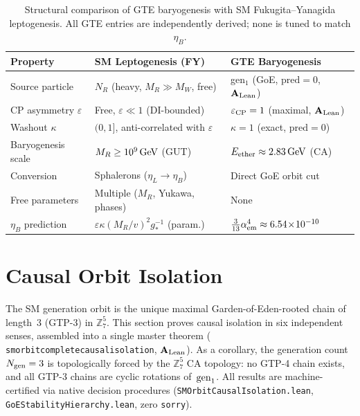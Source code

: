 \documentclass[11pt]{article}
\theoremstyle{remark}
\newcommand{\Ngen}{N_{\rm gen}}
\newcommand{\lean}[1]{%
  \penalty-100
  \begingroup\def\_{\textunderscore\allowbreak}\texttt{#1}\endgroup}
\newcommand{\CatAL}{\ensuremath{\textbf{A}_{\rm Lean}}}
\begin{document}
\begin{table}[h]
\centering
\caption{Structural comparison of GTE baryogenesis with SM Fukugita--Yanagida
         leptogenesis.  All GTE entries are independently derived; none is tuned
         to match $\eta_B$.}
\label{tab:leptogenesis}
\renewcommand{\arraystretch}{1.25}
\small
\begin{tabular}{lll}
\hline
\textbf{Property} & \textbf{SM Leptogenesis (FY)} & \textbf{GTE Baryogenesis} \\
\hline
Source particle
  & $N_R$ (heavy, $M_R\gg M_W$, free)
  & gen$_1$ (GoE, $\mathrm{pred}=0$, $\CatAL$) \\
CP asymmetry $\varepsilon$
  & Free, $\varepsilon\ll 1$ (DI-bounded)
  & $\varepsilon_{\rm CP}=1$ (maximal, $\CatAL$) \\
Washout $\kappa$
  & $(0,1]$, anti-correlated with $\varepsilon$
  & $\kappa=1$ (exact, $\mathrm{pred}=0$) \\
Baryogenesis scale
  & $M_R\geq 10^9\,{\rm GeV}$ (GUT)
  & $E_{\rm ether}\approx 2.83\,{\rm GeV}$ (CA) \\
Conversion
  & Sphalerons ($\eta_L\to\eta_B$)
  & Direct GoE orbit cut \\
Free parameters
  & Multiple ($M_R$, Yukawa, phases)
  & None \\
$\eta_B$ prediction
  & $\varepsilon\kappa(M_R/v)^2g_*^{-1}$ (param.)
  & $\tfrac{3}{13}\alpha_{\rm em}^4\approx 6.54\!\times\!10^{-10}$ \\
\hline
\end{tabular}
\end{table}

\section{Causal Orbit Isolation}
\label{sec:causal_isolation}

The SM generation orbit is the unique maximal Garden-of-Eden-rooted chain
of length~3 (GTP-3) in $\mathbb{Z}_7^5$.
This section proves causal isolation in six independent senses, assembled into
a single master theorem
(\lean{sm\_orbit\_complete\_causal\_isolation}, $\CatAL$).
As a corollary, the generation count $\Ngen = 3$ is topologically forced by
the $\mathbb{Z}_7^5$ CA topology: no GTP-4 chain exists, and all GTP-3 chains
are cyclic rotations of~${\rm gen}_1$.
All results are machine-certified via native decision procedures
(\texttt{SMOrbitCausalIsolation.lean}, \texttt{GoEStabilityHierarchy.lean},
zero \texttt{sorry}).
\end{document}
